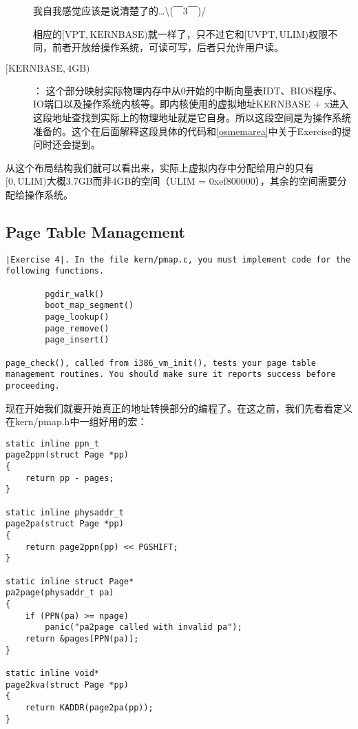 \documentclass{article}
\begin{document}
\begin{CJK*}{UTF8}{gkai}
\begin{description}
我自我感觉应该是说清楚了的\ldots \textbackslash (￣3￣)/

相应的$[\mathrm{VPT},\mathrm{KERNBASE})$就一样了，只不过它和$[\mathrm{UVPT},\mathrm{ULIM})$权限不同，前者开放给操作系统，可读可写，后者只允许用户读。

\item[$[\mathrm{KERNBASE},\mathrm{4GB})$] ：\newline
这个部分映射实际物理内存中从0开始的中断向量表IDT、BIOS程序、IO端口以及操作系统内核等。即内核使用的虚拟地址KERNBASE $+$ x进入这段地址查找到实际上的物理地址就是它自身。所以这段空间是为操作系统准备的。这个在后面解释这段具体的代码和\ref{osmemarea}中关于Exercise的提问时还会提到。
\end{description}

从这个布局结构我们就可以看出来，实际上虚拟内存中分配给用户的只有$[0,\mathrm{ULIM})$大概3.7GB而非4GB的空间（ULIM = 0xef800000），其余的空间需要分配给操作系统。


\subsection{Page Table Management}
\begin{lstlisting}[style=exercise]
|Exercise 4|. In the file kern/pmap.c, you must implement code for the following functions.

        pgdir_walk()
        boot_map_segment()
        page_lookup()
        page_remove()
        page_insert()
	
page_check(), called from i386_vm_init(), tests your page table management routines. You should make sure it reports success before proceeding.
\end{lstlisting}

现在开始我们就要开始真正的地址转换部分的编程了。在这之前，我们先看看定义在kern/pmap.h中一组好用的宏：

\begin{lstlisting}[style=ccode, firstnumber=63, title={\scriptsize \ttfamily \bfseries kern/pmap.h}]
static inline ppn_t
page2ppn(struct Page *pp)
{
	return pp - pages;
}

static inline physaddr_t
page2pa(struct Page *pp)
{
	return page2ppn(pp) << PGSHIFT;
}

static inline struct Page*
pa2page(physaddr_t pa)
{
	if (PPN(pa) >= npage)
		panic("pa2page called with invalid pa");
	return &pages[PPN(pa)];
}

static inline void*
page2kva(struct Page *pp)
{
	return KADDR(page2pa(pp));
}
\end{lstlisting}


\end{CJK*}
\end{document}
